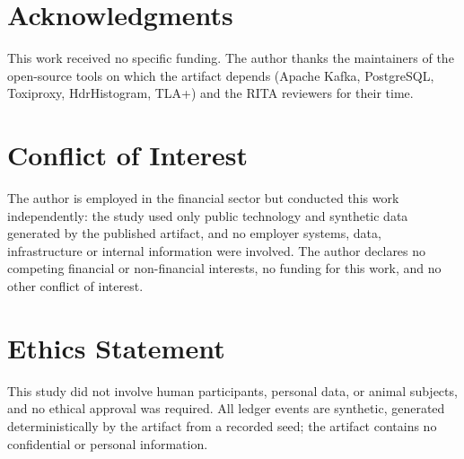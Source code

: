\documentclass[fleqn,12pt]{SelfArx} %
\affiliation{\textsuperscript{1}\textit{Anonymous institution}}
\affiliation{*\textbf{Corresponding author}: anonymous@example.org}
\theoremstyle{plain}
\theoremstyle{definition}
\begin{document}
\setcounter{page}{1}
\flushbottom
\maketitle
\thispagestyle{empty}





















\section*{Acknowledgments}
This work received no specific funding. The author thanks the maintainers of the open-source
tools on which the artifact depends (Apache Kafka, PostgreSQL, Toxiproxy, HdrHistogram, TLA+) and
the RITA reviewers for their time.

\section*{Conflict of Interest}
The author is employed in the financial sector but conducted this work independently: the study
used only public technology and synthetic data generated by the published artifact, and no
employer systems, data, infrastructure or internal information were involved. The author declares
no competing financial or non-financial interests, no funding for this work, and no other conflict
of interest.

\section*{Ethics Statement}
This study did not involve human participants, personal data, or animal subjects, and no ethical
approval was required. All ledger events are synthetic, generated deterministically by the
artifact from a recorded seed; the artifact contains no confidential or personal information.
\end{document}
